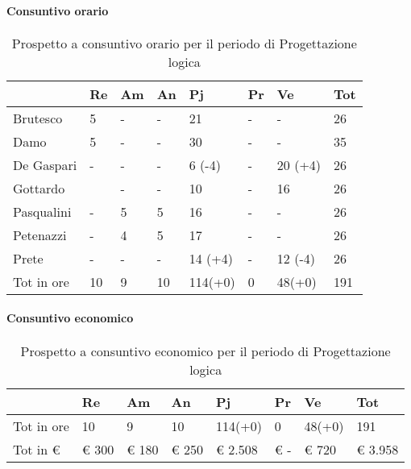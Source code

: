 	\paragraph{Consuntivo orario}
								\begin{table}[h] \begin{center} \begin{tabular}{llllllll}																						
								\toprule																						
									&	Re		&	Am		&	An		&	Pj		&	Pr		&	Ve		&	Tot	 \\ 	
								\midrule																		
								Brutesco	&	5		&	-		&	-		&	21		&	-		&	-		&	26	\\
								Damo		&	5		&	-		&	-		&	30		&	-		&	-		&	35	\\
								De Gaspari	&	-		&	-		&	-		&	6	(-4)	&	-		&	20	(+4)	&	26	\\
								Gottardo	&			&	-		&	-		&	10		&	-		&	16		&	26	\\
								Pasqualini	&	-		&	5		&	5		&	16		&	-		&	-		&	26	\\
								Petenazzi	&	-		&	4		&	5		&	17		&	-		&	-		&	26	\\
								Prete	&	-		&	-		&	-		&	14	(+4)	&	-		&	12	(-4)	&	26	\\
								\midrule																					
								Tot in ore	&	10		&	9		&	10		&	114(+0)		&	0		&	48(+0)		&	191	\\
								
								\bottomrule
								\end{tabular} \end{center} \caption{Prospetto a consuntivo orario per il periodo di																						
									Progettazione logica																						
									}\label{tab:orePl} \end{table}	
	\paragraph{Consuntivo economico}
								\begin{table}[H] \begin{center} \begin{tabular}{llllllll}																						
							\toprule	
								&	Re		&	Am		&	An		&	Pj		&	Pr		&	Ve		&	Tot	 \\ 	
							\midrule																		
							Tot in ore	&	10		&	9		&	10		&	114(+0)		&	0		&	48(+0)		&	191	\\
							Tot in €	&	 € 300 		 & 	 € 180 		 & 	 € 250 		 & 	 € 2.508 		 & 	 € -   		 & 	 € 720 		 & 	 € 3.958 	\\
							\bottomrule																						
							\end{tabular} \end{center} \caption{Prospetto a consuntivo economico per il periodo di																						
							Progettazione logica																						
							}\label{tab:sPl} \end{table}
	
